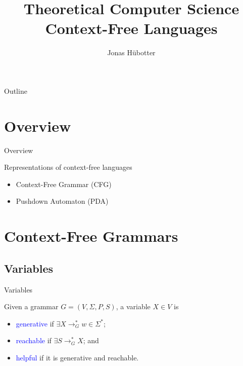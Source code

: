 \documentclass{beamer}
\title[Theoretical Computer Science]{Theoretical Computer Science \\ Context-Free Languages}
\author{Jonas Hübotter}
\date{}
\def\b{\textcolor{blue}}
\begin{document}
\begin{frame}
  \titlepage
\end{frame}

\begin{frame}{Outline}
 \tableofcontents[subsubsectionstyle=hide]
\end{frame}

\section{Overview}

\begin{frame}{Overview}
    \begin{block}{Representations of context-free languages}\pause
        \begin{itemize}
            \item Context-Free Grammar (CFG)\pause
            \item Pushdown Automaton (PDA)
        \end{itemize}
    \end{block}
\end{frame}

\section{Context-Free Grammars}

\subsection{Variables}

\begin{frame}{Variables}
    \begin{definition}
        Given a grammar $G = (V, \Sigma, P, S)$, a variable $X \in V$ is
        \begin{itemize}
            \item \b{generative} if $\exists X \to_G^* w \in \Sigma^*$\pause;
            \item \b{reachable} if $\exists S \to_G^* X$\pause; and
            \item \b{helpful} if it is generative and reachable.
        \end{itemize}
    \end{definition}
\end{frame}
\end{document}
